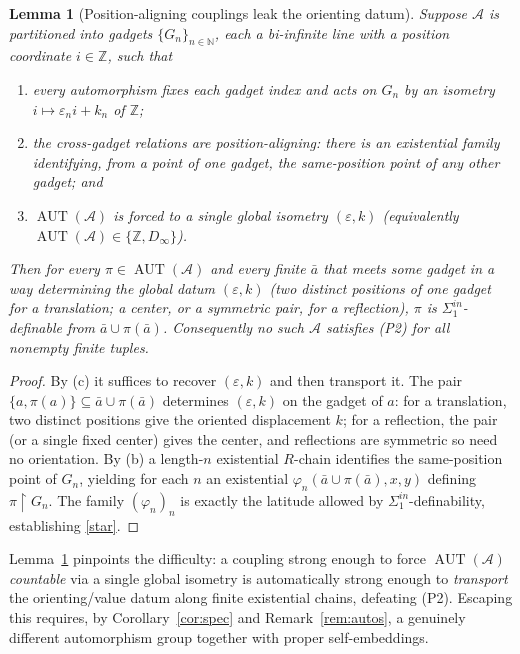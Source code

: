 \documentclass[12pt,fullpage]{article}
\newtheorem{lemma}[theorem]{Lemma}
\theoremstyle{definition}
\newcommand{\A}{\mathcal{A}}
\newcommand{\N}{\mathbb{N}}
\newcommand{\Z}{{\mathbb{Z}}}
\newcommand{\AUT}{\operatorname{AUT}}
\renewcommand{\phi}{\varphi}
\begin{document}
\begin{lemma}[Position-aligning couplings leak the orienting datum]\label{lem:obstruction}
Suppose $\A$ is partitioned into gadgets $\{G_n\}_{n\in\N}$, each a bi-infinite
line with a position coordinate $i\in\Z$, such that
\begin{enumerate}[label=\textup{(\alph*)}]
\item every automorphism fixes each gadget index and acts on $G_n$ by an isometry
  $i\mapsto\varepsilon_n i+k_n$ of $\Z$;
\item the cross-gadget relations are \emph{position-aligning}: there is an
  existential family identifying, from a point of one gadget, the
  same-position point of any other gadget; and
\item $\AUT(\A)$ is forced to a single global isometry
  $(\varepsilon,k)$ (equivalently $\AUT(\A)\in\{\Z,D_\infty\}$).
\end{enumerate}
Then for every $\pi\in\AUT(\A)$ and every finite $\bar a$ that meets some gadget
in a way determining the global datum $(\varepsilon,k)$ \textup{(}two distinct
positions of one gadget for a translation; a center, or a symmetric pair, for a
reflection\textup{)}, $\pi$ is $\Sigma^{in}_1$-definable from
$\bar a\cup\pi(\bar a)$.  Consequently no such $\A$ satisfies (P2) for all
nonempty finite tuples.
\end{lemma}

\begin{proof}
By (c) it suffices to recover $(\varepsilon,k)$ and then transport it.  The pair
$\{a,\pi(a)\}\subseteq\bar a\cup\pi(\bar a)$ determines $(\varepsilon,k)$ on the
gadget of $a$: for a translation, two distinct positions give the oriented
displacement $k$; for a reflection, the pair (or a single fixed center) gives
the center, and reflections are symmetric so need no orientation.  By (b) a
length-$n$ existential $R$-chain identifies the same-position point of $G_n$,
yielding for each $n$ an existential $\phi_n(\bar a\cup\pi(\bar a),x,y)$ defining
$\pi\restriction G_n$.  The family $(\phi_n)_n$ is exactly the latitude allowed
by $\Sigma^{in}_1$-definability, establishing \eqref{star}.
\end{proof}

Lemma~\ref{lem:obstruction} pinpoints the difficulty: a coupling strong enough to
force $\AUT(\A)$ \emph{countable} via a single global isometry is automatically
strong enough to \emph{transport} the orienting/value datum along finite
existential chains, defeating (P2).  Escaping this requires, by
Corollary~\ref{cor:spec} and Remark~\ref{rem:autos}, a genuinely different
automorphism group together with proper self-embeddings.
\end{document}
